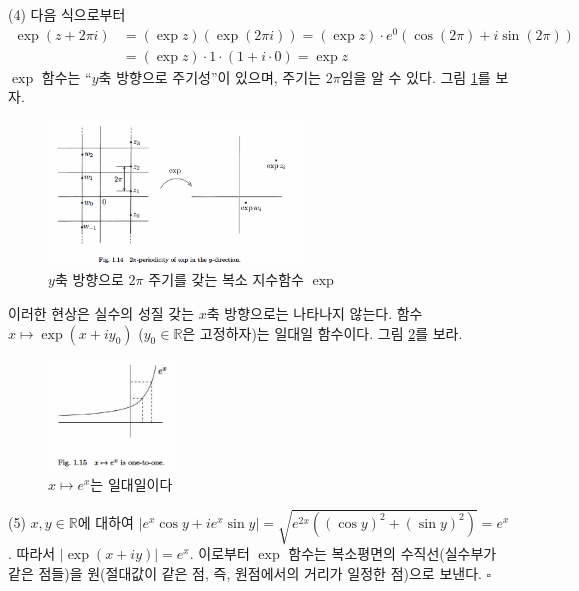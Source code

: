 \noindent
(4) 다음 식으로부터
\begin{align*}
\exp(z+2\pi i)
&= (\exp z)(\exp (2\pi i)) = (\exp z)\cdot e^0(\cos(2\pi) + i\sin(2\pi)) \\
&= (\exp z)\cdot 1\cdot(1+i\cdot 0) = \exp z
\end{align*}
$\exp$ 함수는 ``$y$축 방향으로 주기성''이 있으며, 주기는 $2\pi$임을 알 수 있다.
그림 \ref{fig-1-14}를 보자.

\begin{figure}[!h]
\begin{center}
\includegraphics[width=0.6\textwidth]{./SaltChapter/fig-1-14}
\end{center}
\caption{$y$축 방향으로 $2\pi$ 주기를 갖는 복소 지수함수 $\exp$}
\label{fig-1-14}
\end{figure}

이러한 현상은 실수의 성질 갖는 $x$축 방향으로는 나타나지 않는다.
함수 $x\mapsto \exp(x+iy_0)$ ($y_0\in \mathbb R$은 고정하자)는 일대일 함수이다.
그림 \ref{fig-1-15}를 보라.

\begin{figure}[!h]
\begin{center}
\includegraphics[width=0.3\textwidth]{./SaltChapter/fig-1-15}
\end{center}
\caption{$x\mapsto e^x$는 일대일이다}
\label{fig-1-15}
\end{figure}

\noindent
(5) $x,y \in \mathbb R$에 대하여
$|e^x \cos y + ie^x\sin y| = \sqrt{e^{2x}((\cos y)^2 + (\sin y)^2)} = e^x$.
따라서 $|\exp(x+iy)| = e^x$.
이로부터 $\exp$ 함수는 복소평면의 수직선(실수부가 같은 점들)을
원(절대값이 같은 점, 즉, 원점에서의 거리가 일정한 점)으로 보낸다.
\hfill $\square$

